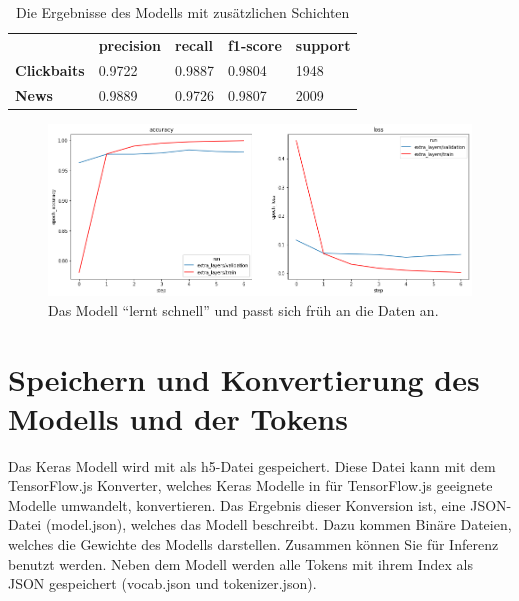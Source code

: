 \begin{table}[h]
    \caption{Die Ergebnisse des Modells mit zusätzlichen Schichten}
    \label{eval2}
    \renewcommand{\arraystretch}{1.2}
    \centering
    \sffamily
    \begin{footnotesize}
        \begin{tabular}{l l l l l}
            \toprule
                           & \textbf{precision} & \textbf{recall} & \textbf{f1-score} & \textbf{support} \\
            \textbf{Clickbaits} & 0.9722                  & 0.9887                 & 0.9804                & 1948          \\
            \textbf{News}  & 0.9889                 & 0.9726                & 0.9807               & 2009                     \\
            \bottomrule
        \end{tabular}
    \end{footnotesize}
    \rmfamily
\end{table}


\begin{figure}[H]
    \centering
    \includegraphics[width=15cm]{kapitel5/complexmodel_.png}
    \caption[Auswirkung der zusätzlichen Schichten]{Das Modell \enquote{lernt schnell} und passt sich früh an die Daten an.}
    \label{extrlayerspic}
\end{figure}

\section{Speichern und Konvertierung des Modells und der Tokens}
Das Keras Modell wird mit als h5-Datei gespeichert. Diese Datei kann mit dem TensorFlow.js Konverter, welches Keras Modelle in für TensorFlow.js geeignete Modelle umwandelt, konvertieren. Das Ergebnis dieser Konversion ist, eine JSON-Datei (model.json), welches das Modell beschreibt. Dazu kommen Binäre Dateien, welches die Gewichte des Modells darstellen. Zusammen können Sie für Inferenz benutzt werden. Neben dem Modell werden alle Tokens mit ihrem Index als JSON gespeichert (vocab.json und tokenizer.json).